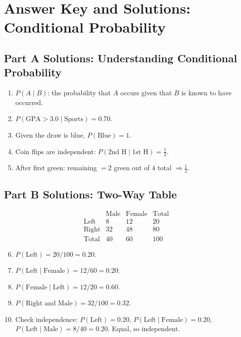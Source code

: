 \documentclass[12pt]{article}
\begin{document}
\newpage


\section*{Answer Key and Solutions: Conditional Probability}

\subsection*{Part A Solutions: Understanding Conditional Probability}
\begin{enumerate}
  \item \(P(A\mid B)\): the probability that \(A\) occurs given that \(B\) is known to have occurred.
  \item \(P(\text{GPA}>3.0\mid \text{Sports})=\boxed{0.70}\).
  \item Given the draw is blue, \(P(\text{Blue})=\boxed{1}\).
  \item Coin flips are independent: \(P(\text{2nd H}\mid \text{1st H})=\boxed{\tfrac{1}{2}}\).
  \item After first green: remaining \(=2\) green out of \(4\) total \(\Rightarrow \boxed{\tfrac{1}{2}}\).
\end{enumerate}

\subsection*{Part B Solutions: Two-Way Table}
\[
\begin{array}{c|ccc}
 & \text{Male} & \text{Female} & \text{Total} \\ \hline
\text{Left} & 8 & 12 & 20\\
\text{Right} & 32 & 48 & 80\\ \hline
\text{Total} & 40 & 60 & 100
\end{array}
\]
\begin{enumerate}
  \setcounter{enumi}{5}
  \item \(P(\text{Left})=20/100=\boxed{0.20}\).
  \item \(P(\text{Left}\mid \text{Female})=12/60=\boxed{0.20}\).
  \item \(P(\text{Female}\mid \text{Left})=12/20=\boxed{0.60}\).
  \item \(P(\text{Right and Male})=32/100=\boxed{0.32}\).
  \item Check independence: \(P(\text{Left})=0.20\), \(P(\text{Left}\mid \text{Female})=0.20\), \(P(\text{Left}\mid \text{Male})=8/40=0.20\). Equal, so \(\boxed{\text{independent}}\).
\end{enumerate}
\end{document}
